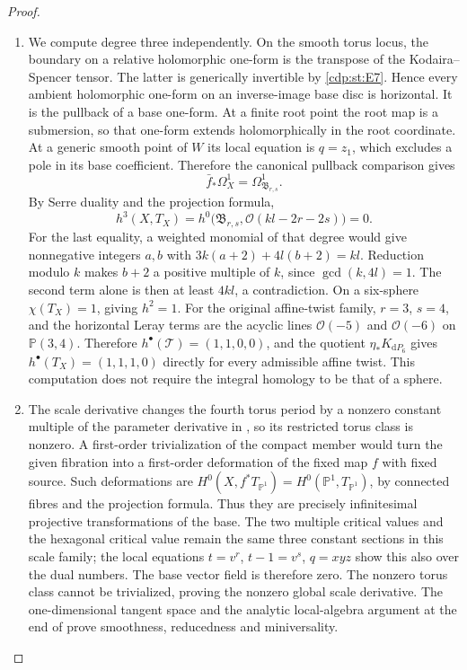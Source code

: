 \begin{proof}
\begin{enumerate}[label={$\langle1\rangle$\arabic*.},leftmargin=*]
\item We compute degree three independently. On the smooth torus locus,
the boundary on a relative holomorphic one-form is the transpose
of the Kodaira--Spencer tensor. The latter is generically invertible
by \ref{cdp:st:E7}. Hence every ambient holomorphic one-form on an inverse-image
base disc is horizontal. It is the pullback of a base one-form.
At a finite root point the root map is a submersion, so that
one-form extends holomorphically in the root coordinate. At a
generic smooth point of $W$ its local equation is $q=z_1$, which
excludes a pole in its base coefficient. Therefore the canonical
pullback comparison gives
\[
 \bar f_*\Omega_X^1=\Omega_{\mathfrak B_{r,s}}^1.
\]
By Serre duality and the projection formula,
\[
 h^3(X,T_X)=h^0\bigl(\mathfrak B_{r,s},
                         \mathcal O(kl-2r-2s)\bigr)=0.
\]
For the last equality, a weighted monomial of that degree would
give nonnegative integers $a,b$ with
$3k(a+2)+4l(b+2)=kl$. Reduction modulo $k$ makes $b+2$ a positive
multiple of $k$, since $\gcd(k,4l)=1$. The second term alone
is then at least $4kl$, a contradiction. On a six-sphere
$\chi(T_X)=1$, giving $h^2=1$. For the original affine-twist
family, $r=3$, $s=4$, and the horizontal Leray terms are the
acyclic lines $\mathcal O(-5)$ and $\mathcal O(-6)$ on
$\mathbb P(3,4)$. Therefore $h^\bullet(\mathcal T)=(1,1,0,0)$,
and the quotient $\eta_*K_{\mathrm dP_6}$ gives
$h^\bullet(T_X)=(1,1,1,0)$ directly for every admissible affine
twist. This computation does not require the integral homology
to be that of a sphere.

\item The scale derivative changes the fourth torus period by a nonzero
constant multiple of the parameter derivative in , so its
restricted torus class is nonzero. A first-order trivialization of
the compact member would turn the given fibration into a
first-order deformation of the fixed map $f$ with fixed source.
Such deformations are $H^0(X,f^*T_{\mathbb P^1})
=H^0(\mathbb P^1,T_{\mathbb P^1})$, by connected fibres and
the projection formula. Thus they are precisely infinitesimal
projective transformations of the base. The two multiple critical
values and the hexagonal critical value remain the same three
constant sections in this scale family; the local equations
$t=v^r$, $t-1=v^s$, $q=xyz$ show this also over the dual numbers.
The base vector field is therefore zero. The nonzero torus class
cannot be trivialized, proving the nonzero global scale derivative.
The one-dimensional tangent space and the analytic local-algebra
argument at the end of  prove smoothness, reducedness and
miniversality.

\end{enumerate}
\end{proof}
